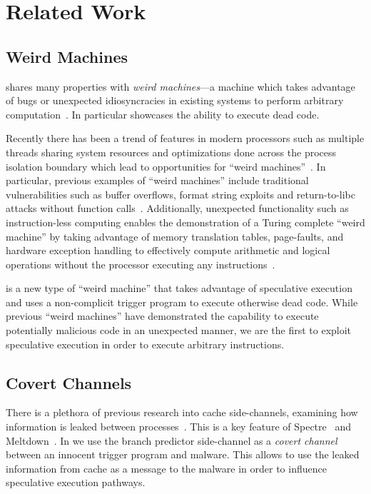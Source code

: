 \section{Related Work}
\label{sec:related-work}


\subsection{Weird Machines}

\speculake shares many properties with \textit{weird machines}---a machine which
takes advantage of bugs or unexpected idiosyncracies in existing systems to
perform arbitrary
computation~\cite{weird_machines,bratus2011exploit}. In
particular \speculake showcases the ability to execute dead code.

Recently there has been a trend of features in modern processors such as
multiple threads sharing system resources and optimizations done across the
process isolation boundary which lead to opportunities for ``weird
machines''~\cite{d2015exploiting}. In particular, previous examples of ``weird
machines'' include traditional vulnerabilities such as buffer overflows, format
string exploits and return-to-libc attacks without function
calls~\cite{buffer_overflow, format_string_exploit, shacham2007geometry}.
Additionally, unexpected functionality such as instruction-less computing
enables the demonstration of a Turing complete ``weird machine'' by taking
advantage of memory translation tables, page-faults, and hardware exception
handling to effectively compute arithmetic and logical operations without the
processor executing any instructions~\cite{bangert2013page}.

\speculake is a new type of ``weird machine'' that takes advantage of
speculative execution and uses a non-complicit trigger program to execute
otherwise dead code. While previous ``weird machines'' have demonstrated the
capability to execute potentially malicious code in an unexpected manner, we are
the first to exploit speculative execution in order to execute arbitrary
instructions.



\subsection{Covert Channels}

There is a plethora of previous research into cache side-channels, examining how
information is leaked between
processes~\cite{percival2005cache,zhang2012cross,osvik2006cache}. This is a key
feature of Spectre~\cite{spectre} and Meltdown~\cite{meltdown}. In \speculake we
use the branch predictor side-channel as a \emph{covert
channel}~\cite{lampson1973note} between an innocent trigger program and malware.
This allows \speculake to use the leaked information from cache as a message to
the malware in order to influence speculative execution pathways.

